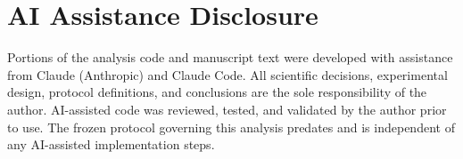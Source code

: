 \documentclass[a4paper,11pt]{article}
\begin{document}
\section*{AI Assistance Disclosure}

Portions of the analysis code and manuscript text were developed with
assistance from Claude (Anthropic) and Claude Code.
All scientific decisions, experimental design, protocol definitions, and
conclusions are the sole responsibility of the author.
AI-assisted code was reviewed, tested, and validated by the author prior to
use.
The frozen protocol governing this analysis predates and is independent of
any AI-assisted implementation steps.
\end{document}
